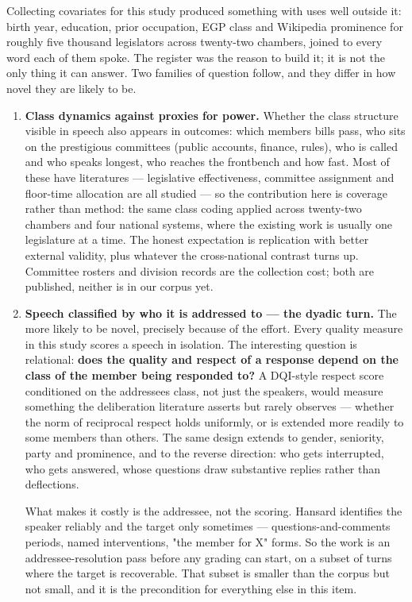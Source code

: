 Collecting covariates for this study produced something with uses well outside
it: birth year, education, prior occupation, EGP class and Wikipedia prominence
for roughly five thousand legislators across twenty-two chambers, joined to
every word each of them spoke. The register was the reason to build it; it is
not the only thing it can answer. Two families of question follow, and they
differ in how novel they are likely to be.

\begin{enumerate}
\def\labelenumi{\arabic{enumi}.}
\setcounter{enumi}{35}
\item
  \textbf{Class dynamics against proxies for power.} Whether the class structure
  visible in speech also appears in outcomes: which members\textquotesingle{} bills pass, who
  sits on the prestigious committees (public accounts, finance, rules), who
  is called and who speaks longest, who reaches the frontbench and how fast.
  Most of these have literatures --- legislative effectiveness, committee
  assignment and floor-time allocation are all studied --- so the contribution
  here is coverage rather than method: the same class coding applied across
  twenty-two chambers and four national systems, where the existing work is
  usually one legislature at a time. The honest expectation is replication
  with better external validity, plus whatever the cross-national contrast
  turns up. Committee rosters and division records are the collection cost;
  both are published, neither is in our corpus yet.
\item
  \textbf{Speech classified by who it is addressed to --- the dyadic turn.} The
  more likely to be novel, precisely because of the effort. Every quality
  measure in this study scores a speech in isolation. The interesting
  question is relational: \textbf{does the quality and respect of a response depend
  on the class of the member being responded to?} A DQI-style respect score
  conditioned on the addressee\textquotesingle s class, not just the speaker\textquotesingle s, would measure
  something the deliberation literature asserts but rarely observes --- whether
  the norm of reciprocal respect holds uniformly, or is extended more readily
  to some members than others. The same design extends to gender, seniority,
  party and prominence, and to the reverse direction: who gets interrupted,
  who gets answered, whose questions draw substantive replies rather than
  deflections.

  What makes it costly is the addressee, not the scoring. Hansard identifies
  the speaker reliably and the target only sometimes --- questions-and-comments
  periods, named interventions, "the member for X" forms. So the work is an
  addressee-resolution pass before any grading can start, on a subset of
  turns where the target is recoverable. That subset is smaller than the
  corpus but not small, and it is the precondition for everything else in
  this item.


\end{enumerate}
